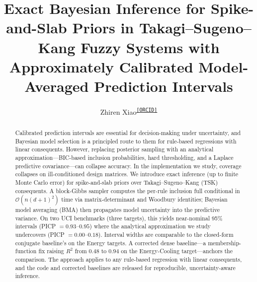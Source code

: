 \documentclass[review,1p,times]{elsarticle}
\providecommand{\orcid}[1]{\textsuperscript{\href{https://orcid.org/#1}{\texttt{[ORCID]}}}}
\begin{document}
\begin{frontmatter}

\title{Exact Bayesian Inference for Spike-and-Slab Priors in Takagi--Sugeno--Kang Fuzzy Systems with Approximately Calibrated Model-Averaged Prediction Intervals}

\author[addr]{Zhiren Xiao\orcid{0009-0008-2164-4557}}
\address[addr]{Guangdong University of Finance, Guangzhou, China}

\begin{abstract}
Calibrated prediction intervals are essential for decision-making under uncertainty, and Bayesian model selection is a principled route to them for rule-based regressions with linear consequents.
However, replacing posterior sampling with an analytical approximation---BIC-based inclusion probabilities, hard thresholding, and a Laplace predictive covariance---can collapse accuracy.
In the implementation we study, coverage collapses on ill-conditioned design matrices.
We introduce exact inference (up to finite Monte Carlo error) for spike-and-slab priors over Takagi--Sugeno--Kang (TSK) consequents.
A block-Gibbs sampler computes the per-rule inclusion full conditional in $\mathcal{O}(n(d{+}1)^2)$ time via matrix-determinant and Woodbury identities; Bayesian model averaging (BMA) then propagates model uncertainty into the predictive variance.
On two UCI benchmarks (three targets), this yields near-nominal 95\% intervals (PICP $=0.93$--$0.95$) where the analytical approximation we study undercovers (PICP $=0.00$--$0.18$).
Interval widths are comparable to the closed-form conjugate baseline's on the Energy targets.
A corrected dense baseline---a membership-function fix raising $R^2$ from $0.48$ to $0.94$ on the Energy-Cooling target---anchors the comparison.
The approach applies to any rule-based regression with linear consequents, and the code and corrected baselines are released for reproducible, uncertainty-aware inference.
\end{abstract}


\end{frontmatter}
\end{document}

